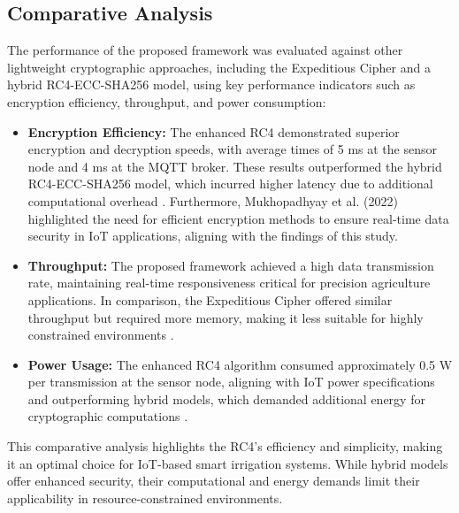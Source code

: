 \documentclass[runningheads]{llncs}
\begin{document}

\subsection{Comparative Analysis}

The performance of the proposed framework was evaluated against other lightweight cryptographic approaches, including the Expeditious Cipher and a hybrid RC4-ECC-SHA256 model, using key performance indicators such as encryption efficiency, throughput, and power consumption:

\begin{itemize}
    \item \textbf{Encryption Efficiency:} The enhanced RC4 demonstrated superior encryption and decryption speeds, with average times of 5 ms at the sensor node and 4 ms at the MQTT broker. These results outperformed the hybrid RC4-ECC-SHA256 model, which incurred higher latency due to additional computational overhead \cite{ref10,ref15}. Furthermore, Mukhopadhyay et al. (2022) \cite{ref9} highlighted the need for efficient encryption methods to ensure real-time data security in IoT applications, aligning with the findings of this study.
    \item \textbf{Throughput:} The proposed framework achieved a high data transmission rate, maintaining real-time responsiveness critical for precision agriculture applications. In comparison, the Expeditious Cipher offered similar throughput but required more memory, making it less suitable for highly constrained environments \cite{ref1}.
    \item \textbf{Power Usage:} The enhanced RC4 algorithm consumed approximately 0.5 W per transmission at the sensor node, aligning with IoT power specifications and outperforming hybrid models, which demanded additional energy for cryptographic computations \cite{ref16}.
\end{itemize}

This comparative analysis highlights the RC4's efficiency and simplicity, making it an optimal choice for IoT-based smart irrigation systems. While hybrid models offer enhanced security, their computational and energy demands limit their applicability in resource-constrained environments. 
\end{document}
